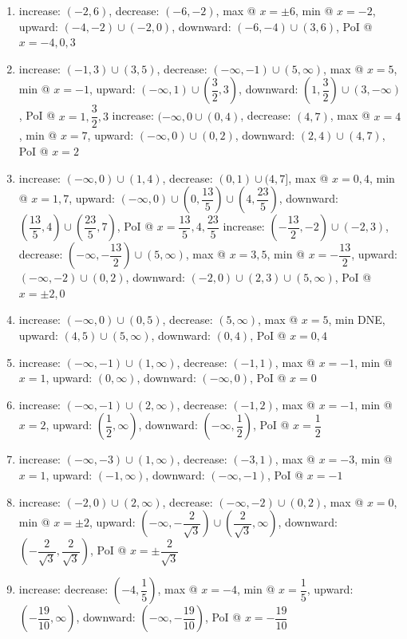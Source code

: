 \documentclass{book}
\begin{document}
\begin{appendices}
\begin{enumerate}[!HW!]
\item  increase: $(-2,6)$, decrease: $(-6,-2)$, max @ $x=\pm6$, min @ $x=-2$, upward: $(-4,-2)\cup (-2,0)$, downward: $(-6,-4)\cup(3,6)$, PoI @ $x=-4,0,3$
\item  increase: $(-1,3)\cup(3,5)$, decrease: $(-\infty,-1)\cup (5,\infty)$, max @ $x=5$, min @ $x=-1$, upward: $(-\infty,1)\cup \left(\dfrac{3}{2},3\right)$, downward: $\left(1,\dfrac{3}{2}\right)\cup(3,-\infty)$, PoI @ $x=1,\dfrac{3}{2}, 3$
\itemspade  increase: $(-\infty,0\cup(0,4)$, decrease: $(4,7)$, max @ $x=4$, min @ $x=7$, upward: $(-\infty,0)\cup (0,2)$, downward: $(2,4)\cup(4,7)$, PoI @ $x=2$
\item  increase: $(-\infty,0)\cup(1,4)$, decrease: $(0,1)\cup(4,7]$, max @ $x=0, 4$, min @ $x=1, 7$, upward: $(-\infty,0)\cup \left(0,\dfrac{13}{5}\right)\cup\left(4,\dfrac{23}{5}\right)$, downward: $\left(\dfrac{13}{5},4\right)\cup\left(\dfrac{23}{5},7\right)$, PoI @ $x=\dfrac{13}{5}, 4, \dfrac{23}{5}$
\itemspade  increase: $\left(-\dfrac{13}{2}, -2\right)\cup(-2,3)$, decrease: $\left(-\infty,-\dfrac{13}{2}\right)\cup(5,\infty)$, max @ $x=3,5$, min @ $x=-\dfrac{13}{2}$, upward: $(-\infty,-2)\cup (0,2)$, downward: $(-2,0)\cup (2,3)\cup(5,\infty)$, PoI @ $x=\pm2,0$
\item increase: $(-\infty,0)\cup(0,5)$, decrease: $(5,\infty)$, max @ $x=5$, min  DNE, upward: $(4,5)\cup (5,\infty)$, downward: $(0,4)$, PoI @ $x=0,4$
\item increase: $(-\infty,-1) \cup (1,\infty)$, decrease: $(-1,1)$, max @ $x = -1$,  min @ $x = 1$, upward: $(0,\infty)$, downward: $(-\infty,0)$, PoI @ $x=0$
\item increase: $(-\infty, -1)\cup (2,\infty)$, decrease: $(-1,2)$, max @ $x = -1$,  min @ $x = 2$, upward: $\left(\dfrac{1}{2},\infty\right)$, downward: $\left(-\infty,\dfrac{1}{2}\right)$, PoI @ $x=\dfrac{1}{2}$
\item  increase: ${(-\infty, -3)\cup (1,\infty)}$, decrease: $(-3,1)$, max @ $x = -3$,  min @ $x = 1$, upward: $(-1,\infty)$, downward: $(-\infty,-1)$, PoI @ $x=-1$
\item  increase: $(-2,0) \cup (2,\infty)$, decrease: $(-\infty,-2)\cup(0,2)$, max @ $x = 0$,  min @ $x = \pm2$, upward: $\left(-\infty,-\dfrac{2}{\sqrt{3}}\right)\cup\left(\dfrac{2}{\sqrt{3}}, \infty\right)$, downward: $\left(-\dfrac{2}{\sqrt{3}},\dfrac{2}{\sqrt{3}}\right)$, PoI @ $x=\pm\dfrac{2}{\sqrt{3}}$
\item  increase:  decrease: $\left(-4,\dfrac{1}{5}\right)$, max @ $x=-4$,  min @ $x=\dfrac{1}{5}$, upward: $\left(-\dfrac{19}{10},\infty\right)$, downward: $\left(-\infty,-\dfrac{19}{10}\right)$, PoI @ $x=-\dfrac{19}{10}$

\end{enumerate}
\end{appendices}
\end{document}
